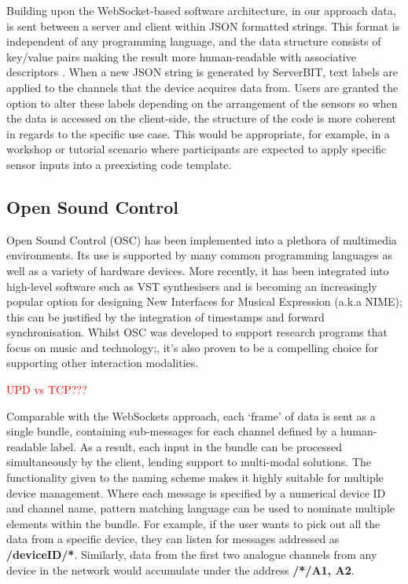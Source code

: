 Building upon the WebSocket-based software architecture, in our approach data, is sent between a server and client within JSON formatted strings. This format is independent of any programming language, and the data structure consists of key/value pairs making the result more human-readable with associative descriptors \cite{marrs_json_2017}. When a new JSON string is generated by ServerBIT, text labels are applied to the channels that the device acquires data from. Users are granted the option to alter these labels depending on the arrangement of the sensors so when the data is accessed on the client-side, the structure of the code is more coherent in regards to the specific use case. This would be appropriate, for example, in a workshop or tutorial scenario where participants are expected to apply specific sensor inputs into a preexisting code template.

\subsection{Open Sound Control}

Open Sound Control (OSC) has been implemented into a plethora of multimedia environments. Its use is supported by many common programming languages as well as a variety of hardware devices. More recently, it has been integrated into high-level software such as VST synthesisers and is becoming an increasingly popular option for designing New Interfaces for Musical Expression (a.k.a NIME); this can be justified by the integration of timestamps and forward synchronisation\cite{schmeder_best_2010}. Whilst OSC was developed to support research programs that focus on music and technology;\cite{freed_features_2009}, it’s also proven to be a compelling choice for supporting other interaction modalities.

\textcolor{red}{UPD vs TCP???}

Comparable with the WebSockets approach, each ‘frame’ of data is sent as a single bundle, containing sub-messages for each channel defined by a human-readable label. As a result, each input in the bundle can be processed simultaneously by the client, lending support to multi-modal solutions. The functionality given to the naming scheme makes it highly suitable for multiple device management. Where each message is specified by a numerical device ID and channel name, pattern matching language can be used to nominate multiple elements within the bundle. For example, if the user wants to pick out all the data from a specific device, they can listen for messages addressed as \textbf{/deviceID/*}. Similarly, data from the first two analogue channels from any device in the network would accumulate under the address \textbf{/*/{A1, A2}}.

